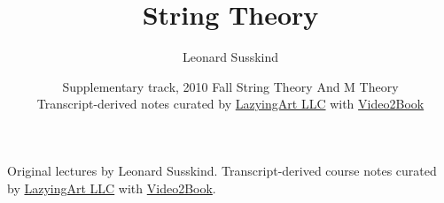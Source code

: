 \documentclass[11pt,oneside]{book}
\begin{document}
\frontmatter
\title{String Theory}
\author{Leonard Susskind}
\date{Supplementary track, 2010 Fall String Theory And M Theory \\ Transcript-derived notes curated by \href{https://lazying.art}{LazyingArt LLC} with \href{https://github.com/lachlanchen/Video2Book}{Video2Book}}
\maketitle
\begin{center}
\small Original lectures by Leonard Susskind. Transcript-derived course notes curated by \href{https://lazying.art}{LazyingArt LLC} with \href{https://github.com/lachlanchen/Video2Book}{Video2Book}.
\end{center}
\clearpage
\tableofcontents
\mainmatter










\end{document}
